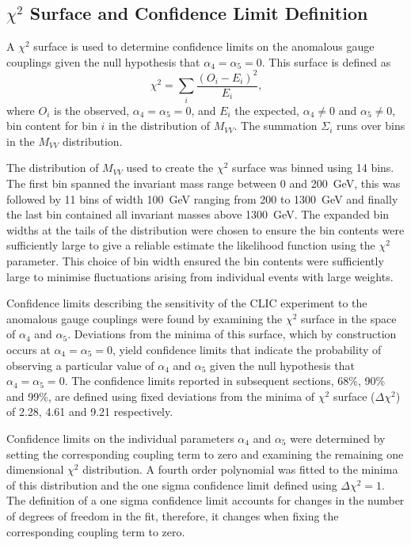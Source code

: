 \subsection{$\chi^{2}$ Surface and Confidence Limit Definition}
\label{sec:chi2surfacedefinition}
A $\chi^{2}$ surface is used to determine confidence limits on the anomalous gauge couplings given the null hypothesis that $\alpha_{4} = \alpha_{5} = 0$.  This surface is defined as  
%
\begin{equation}
\chi^{2} = \sum_{i} \frac{(O_{i} - E_{i})^{2}}{E_{i}} \text{,}
\end{equation}
%
\noindent where $O_{i}$ is the observed, $\alpha_{4} = \alpha_{5} = 0$, and $E_{i}$ the expected, $\alpha_{4} \neq 0$ and $\alpha_{5} \neq 0$, bin content for bin $i$ in the distribution of $M_{VV}$.  The summation $\Sigma_{i}$ runs over bins in the $M_{VV}$ distribution.  

The distribution of $M_{VV}$ used to create the $\chi^{2}$ surface was binned using 14 bins.  The first bin spanned the invariant mass range between 0 and 200~GeV, this was followed by 11 bins of width 100~GeV ranging from 200 to 1300~GeV and finally the last bin contained all invariant masses above 1300~GeV.  The expanded bin widths at the tails of the distribution were chosen to ensure the bin contents were sufficiently large to give a reliable estimate the likelihood function using the $\chi^{2}$ parameter.  This choice of bin width ensured the bin contents were sufficiently large to minimise fluctuations arising from individual events with large weights.

Confidence limits describing the sensitivity of the CLIC experiment to the anomalous gauge couplings were found by examining the $\chi^{2}$ surface in the space of $\alpha_{4}$ and $\alpha_{5}$.  Deviations from the minima of this surface, which by construction occurs at $\alpha_{4} = \alpha_{5} = 0$, yield confidence limits that indicate the probability of observing a particular value of $\alpha_{4}$ and $\alpha_{5}$ given the null hypothesis that $\alpha_{4} = \alpha_{5} = 0$.  The confidence limits reported in subsequent sections, 68\%, 90\% and 99\%, are defined using fixed deviations from the minima of $\chi^{2}$ surface ($\Delta\chi^{2}$) of 2.28, 4.61 and 9.21 respectively.

Confidence limits on the individual parameters $\alpha_{4}$ and $\alpha_{5}$ were determined by setting the corresponding coupling term to zero and examining the remaining one dimensional $\chi^{2}$ distribution.  A fourth order polynomial was fitted to the minima of this distribution and the one sigma confidence limit defined using $\Delta\chi^{2} = 1$.  The definition of a one sigma confidence limit accounts for changes in the number of degrees of freedom in the fit, therefore, it changes when fixing the corresponding coupling term to zero.  

